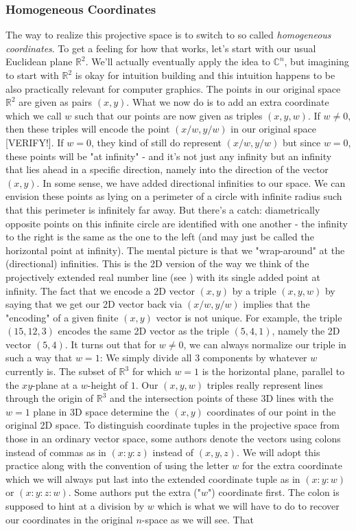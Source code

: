 \subsubsection{Homogeneous Coordinates}
The way to realize this projective space is to switch to so called \emph{homogeneous coordinates}. To get a feeling for how that works, let's start with our usual Euclidean plane $\mathbb{R}^2$. We'll actually eventually apply the idea to $\mathbb{C}^n$, but imagining to start with $\mathbb{R}^2$ is okay for intuition building and this intuition happens to be also practically relevant for computer graphics. The points in our original space $\mathbb{R}^2$ are given as pairs $(x,y)$. What we now do is to add an extra coordinate which we call $w$ such that our points are now given as triples $(x, y, w)$. If $w \neq 0$, then these triples will encode the point $(x/w, y/w)$ in our original space [VERIFY!]. If $w=0$, they kind of still do represent $(x/w, y/w)$ but since $w = 0$, these points will be "at infinity" - and it's not just any infinity but an infinity that lies ahead in a specific direction, namely into the direction of the vector $(x,y)$. In some sense, we have added directional infinities to our space. We can envision these points as lying on a perimeter of a circle with infinite radius such that this perimeter is infinitely far away. But there's a catch: diametrically opposite points on this infinite circle are identified with one another - the infinity to the right is the same as the one to the left (and may just be called the horizontal point at infinity). The mental picture is that we "wrap-around" at the (directional) infinities. This is the 2D version of the way we think of the projectively extended real number line (see \cite{WK_ProjExtReals}) with its single added point at infinity. The fact that we encode a 2D vector $(x,y)$ by a triple $(x,y,w)$ by saying that we get our 2D vector back via $(x/w, y/w)$ implies that the "encoding" of a given finite $(x,y)$ vector is not unique. For example, the triple $(15,12,3)$ encodes the same 2D vector as the triple $(5,4,1)$, namely the 2D vector $(5,4)$. It turns out that for $w \neq 0$, we can always normalize our triple in such a way that $w=1$: We simply divide all 3 components by whatever $w$ currently is. The subset of $\mathbb{R}^3$ for which $w = 1$ is the horizontal plane, parallel to the $xy$-plane at a $w$-height of $1$. Our $(x,y,w)$ triples really represent lines through the origin of $\mathbb{R}^3$ and the intersection points of these 3D lines with the $w=1$ plane in 3D space determine the $(x,y)$ coordinates of our point in the original 2D space. To distinguish coordinate tuples in the projective space from those in an ordinary vector space, some authors denote the vectors using colons instead of commas as in $(x : y : z)$ instead of $(x, y, z)$. We will adopt this practice along with the convention of using the letter $w$ for the extra coordinate which we will always put last into the extended coordinate tuple as in $(x : y : w)$ or $(x : y : z : w)$. Some authors put the extra ("$w$") coordinate first. The colon is supposed to hint at a division by $w$ which is what we will have to do to recover our coordinates in the original $n$-space as we will see. That 